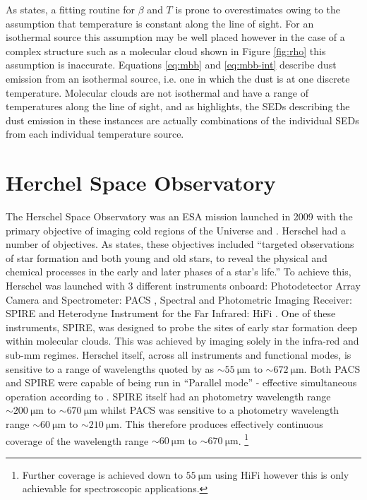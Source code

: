 \documentclass{report}
\begin{document}
As \textcite{noise} states, a fitting routine for $\beta$ and $T$ is prone to overestimates owing to the assumption that temperature is constant along the line of sight. For an isothermal source this assumption may be well placed however in the case of a complex structure such as a molecular cloud shown in Figure \ref{fig:rho} this assumption is inaccurate. Equations \ref{eq:mbb} and \ref{eq:mbb-int} describe dust emission from an isothermal source, i.e. one in which the dust is at one discrete temperature. Molecular clouds are not isothermal and have a range of temperatures along the line of sight, and as \textcite{noise} highlights, the SEDs describing the dust emission in these instances are actually combinations of the individual SEDs from each individual temperature source.

\section{Herchel Space Observatory}
The Herschel Space Observatory was an ESA mission launched in 2009 with the primary objective of imaging cold regions of the Universe \parencite{herschel} and \parencite{fact}. Herschel had a number of objectives. As \textcite{fact} states, these objectives included ``targeted observations of star formation and both young and old stars, to reveal the physical and chemical processes in the early and later phases of a star’s life.'' To achieve this, Herschel was launched with 3 different instruments onboard: Photodetector Array Camera and Spectrometer: PACS \parencite{PACS}, Spectral and Photometric Imaging Receiver: SPIRE \parencite{SPIRE} and Heterodyne Instrument for the Far Infrared: HiFi \parencite{HiFi}. One of these instruments, SPIRE, was designed to probe the sites of early star formation deep within molecular clouds. This was achieved by imaging solely in the infra-red and sub-mm regimes. Herschel itself, across all instruments and functional modes, is sensitive to a range of wavelengths quoted by \textcite{herschel} as $\sim \SI{55}{\micro\meter}$ to $\sim \SI{672}{\micro\meter}$. Both PACS and SPIRE were capable of being run in ``Parallel mode'' - effective simultaneous operation according to \textcite{herschel}. SPIRE itself had an photometry wavelength range
$\sim \SI{200}{\micro\meter}$ to $\sim \SI{670}{\micro\meter}$ whilst PACS was sensitive to a photometry wavelength range $\sim \SI{60}{\micro\meter}$ to $\sim \SI{210}{\micro\meter}$. This therefore produces effectively continuous coverage of the wavelength range $\sim \SI{60}{\micro\meter}$ to $\sim \SI{670}{\micro\meter}$.
\footnote{Further coverage is achieved down to $\SI{55}{\micro\meter}$ using HiFi however this is only achievable for spectroscopic applications.}
\end{document}
